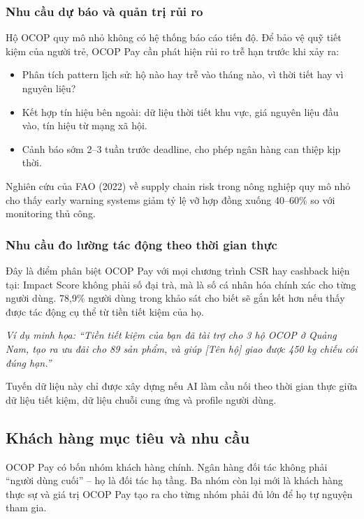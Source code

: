 \documentclass[13pt,a4paper]{extarticle}
\begin{document}
\subsubsection{Nhu cầu dự báo và quản trị rủi ro}

Hộ OCOP quy mô nhỏ không có hệ thống báo cáo tiến độ. Để bảo vệ quỹ tiết kiệm của người trẻ, OCOP Pay cần phát hiện rủi ro trễ hạn trước khi xảy ra:

\begin{itemize}
    \item Phân tích pattern lịch sử: hộ nào hay trễ vào tháng nào, vì thời tiết hay vì nguyên liệu?
    \item Kết hợp tín hiệu bên ngoài: dữ liệu thời tiết khu vực, giá nguyên liệu đầu vào, tín hiệu từ mạng xã hội.
    \item Cảnh báo sớm 2--3 tuần trước deadline, cho phép ngân hàng can thiệp kịp thời.
\end{itemize}

Nghiên cứu của FAO (2022) về supply chain risk trong nông nghiệp quy mô nhỏ cho thấy early warning systems giảm tỷ lệ vỡ hợp đồng xuống 40--60\% so với monitoring thủ công.

\subsubsection{Nhu cầu đo lường tác động theo thời gian thực}

Đây là điểm phân biệt OCOP Pay với mọi chương trình CSR hay cashback hiện tại: Impact Score không phải số đại trà, mà là số cá nhân hóa chính xác cho từng người dùng. 78,9\% người dùng trong khảo sát cho biết sẽ gắn kết hơn nếu thấy được tác động cụ thể từ tiền tiết kiệm của họ.

\textit{Ví dụ minh họa: ``Tiền tiết kiệm của bạn đã tài trợ cho 3 hộ OCOP ở Quảng Nam, tạo ra ưu đãi cho 89 sản phẩm, và giúp [Tên hộ] giao được 450 kg chiếu cói đúng hạn.''}

Tuyến dữ liệu này chỉ được xây dựng nếu AI làm cầu nối theo thời gian thực giữa dữ liệu tiết kiệm, dữ liệu chuỗi cung ứng và profile người dùng.

\subsection{Khách hàng mục tiêu và nhu cầu}

OCOP Pay có bốn nhóm khách hàng chính. Ngân hàng đối tác không phải ``người dùng cuối'' -- họ là đối tác hạ tầng. Ba nhóm còn lại mới là khách hàng thực sự và giá trị OCOP Pay tạo ra cho từng nhóm phải đủ lớn để họ tự nguyện tham gia.
\end{document}
